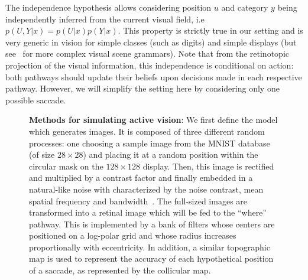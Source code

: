 The independence hypothesis allows considering position $u$ and category $y$ being independently inferred from the current visual field, i.e $p(U,Y|x) = p(U|x) p(Y|x)$. This property is strictly true in our setting and is very generic in vision for simple classes (such as digits) and simple displays (but see~\citep{Vo12} for more complex visual scene grammars). Note that from the retinotopic projection of the visual information, this independence is conditional on action: both pathways should update their beliefs upon decisions made in each respective pathway. However, we will simplify the setting here by considering only one possible saccade.
\begin{figure}[t!]%
\caption{
{\bf Methods for simulating active vision}:
\A We first define the model which generates images. It is composed of three different random processes: one choosing a sample image from the MNIST database (of size $28\times 28$) and placing it at a random position within the circular mask on the $128\times 128$ display. Then, this image is rectified and multiplied by a contrast factor and finally embedded in a natural-like noise with characterized by the noise contrast, mean spatial frequency and bandwidth~\citep{Sanz12}. %
\B The full-sized images are transformed into a retinal image which will be fed to the ``where'' pathway. This is implemented by a bank of filters whose centers are positioned on a log-polar grid and whose radius increases proportionally with eccentricity. In addition, a similar topographic map is used to represent the accuracy of each hypothetical position of a saccade, as represented by the collicular map. %
}
\end{figure}
